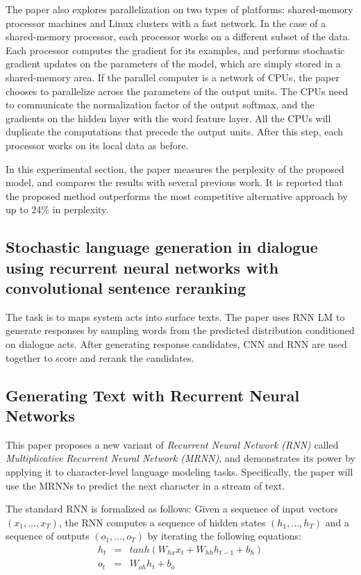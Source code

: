 \documentclass[paper=a4, fontsize=18pt]{article} %
\numberwithin{equation}{section} %
\numberwithin{figure}{section} %
\numberwithin{table}{section} %
\begin{document}
The paper also explores parallelization on two types of platforms: shared-memory processor machines and Linux clusters with a fast network. In the case of a shared-memory processor, each processor works on a different subset of the data. Each processor computes the gradient for its examples, and performs stochastic gradient updates on the parameters of the model, which are simply stored in a shared-memory area. If the parallel computer is a network of CPUs, the paper chooses to parallelize across the parameters of the output units. The CPUs need to communicate the normalization factor of the output softmax, and the gradients on the hidden layer with the word feature layer. All the CPUs will duplicate the computations that precede the output units. After this step, each processor works on its local data as before.

In this experimental section, the paper measures the perplexity of the proposed model, and compares the results with several previous work. It is reported that the proposed method outperforms the most competitive alternative approach by up to 24\% in perplexity.


\subsection{Stochastic language generation in dialogue using recurrent neural networks with convolutional sentence reranking \cite{Wen2015Stochastic}}

The task is to maps system acts into surface texts. The paper uses RNN LM to generate responses by sampling words from the predicted distribution conditioned on dialogue acts. After generating response candidates, CNN and RNN are used together to score and rerank the candidates.

\subsection{Generating Text with Recurrent Neural Networks \cite{Martens2011}}

This paper proposes a new variant of \emph{Recurrent Neural Network (RNN)} called \emph{Multiplicative Recurrent Neural Network (MRNN)}, and demonstrates its power by applying it to character-level language modeling tasks. Specifically, the paper will use the MRNNs to predict the next character in a stream of text.

The standard RNN is formalized as follows: Given a sequence of input vectors $(x_1, ..., x_T)$, the RNN computes a sequence of hidden states $(h_1, ..., h_T)$ and a sequence of outputs $(o_1, ..., o_T)$ by iterating the following equations:
\begin{eqnarray}
h_t &=& tanh(W_{hx}x_t + W_{hh}h_{t-1} + b_h)\\
o_t &=& W_{oh}h_t + b_o
\end{eqnarray}
\end{document}
